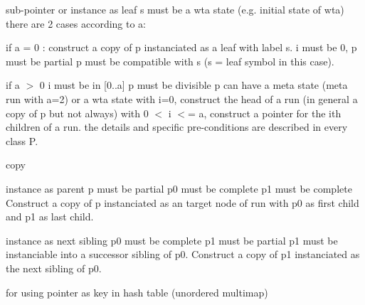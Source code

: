 \begin{DoxyCode}{0}
\end{DoxyCode}
 sub-\/pointer or instance as leaf s must be a wta state (e.\+g. initial state of wta) there are 2 cases according to a\+:
\begin{DoxyEnumerate}
\item if a = 0 \+: construct a copy of p instanciated as a leaf with label s. i must be 0, p must be partial p must be compatible with s (s = leaf symbol in this case).
\item if a $>$ 0 i must be in \mbox{[}0..a\mbox{]} p must be divisible p can have a meta state (meta run with a=2) or a wta state with i=0, construct the head of a run (in general a copy of p but not always) with 0 $<$ i $<$= a, construct a pointer for the ith children of a run. the details and specific pre-\/conditions are described in every class P.
\end{DoxyEnumerate}


\begin{DoxyCode}{0}
\end{DoxyCode}
 copy


\begin{DoxyCode}{0}
\end{DoxyCode}
 instance as parent p must be partial p0 must be complete p1 must be complete Construct a copy of p instanciated as an target node of run with p0 as first child and p1 as last child.


\begin{DoxyCode}{0}
\end{DoxyCode}
 instance as next sibling p0 must be complete p1 must be partial p1 must be instanciable into a successor sibling of p0. Construct a copy of p1 instanciated as the next sibling of p0.


\begin{DoxyCode}{0}
\end{DoxyCode}



\begin{DoxyCode}{0}
\end{DoxyCode}
 for using pointer as key in hash table (unordered multimap)


